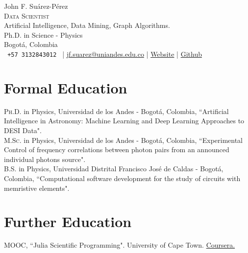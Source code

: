 \documentclass[10pt, a4paper]{article}
\newcommand{\years}[1]{\marginnote{\scriptsize #1}}
\begin{document}
{\LARGE John F. Suárez-Pérez}\\[0.5cm]
\textsc{Data Scientist}\\
Artificial Intelligence, Data Mining, Graph Algorithms.\\

Ph.D. in Science - Physics \\
Bogotá, Colombia\\[.2cm]
\texttt{ +57 3132843012 }
\hspace{0.3cm}|\hspace{0.3cm}
\href{mailto:jf.suarez@uniandes.edu.co}{jf.suarez@uniandes.edu.co}
\hspace{0.3cm}|\hspace{0.3cm}
\href{https://jsuarez314.gitlab.io}{Website}
\hspace{0.3cm}|\hspace{0.3cm}
\href{https://github.com/jsuarez314}{Github}



\section*{Formal Education}
\noindent
\years{2023}\textsc{Ph.D.} in Physics, Universidad de los Andes - Bogotá, Colombia, “Artificial 
Intelligence in Astronomy: Machine Learning and Deep Learning Approaches to DESI Data".\\

\years{2017}\textsc{M.Sc.} in Physics, Universidad de los Andes - Bogotá, Colombia, “Experimental 
Control of frequency correlations between photon pairs from an announced individual photons 
source".\\

\years{2014}\textsc{B.S.} in Physics, Universidad Distrital Francisco José de Caldas - 
Bogotá, Colombia, “Computational software development for the study of circuits with memristive 
elements".\\


\section*{Further Education}
\noindent
\years{2021}\textsc{MOOC}, “Julia Scientific Programming". University of Cape Town. \href{https://coursera.org/share/faa0fcc877c44d0c38b6a2c4179818f2}{Coursera.}\\
\end{document}

